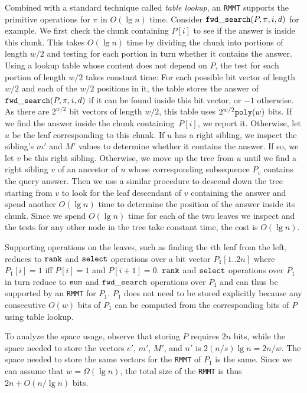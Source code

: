 Combined with a standard technique called {\em table lookup}, an {\tt RMMT}
supports the primitive operations
for $\pi$ in $O(\lg n)$ time.  Consider
$\mathtt{fwd\_search}(P,\pi,i,d)$ for example.  We first check the chunk containing $P[i]$
to see if the answer is inside this chunk.  This takes
$O(\lg n)$ time by dividing the chunk into portions of length $w/2$
and testing for each portion in turn whether it contains the answer.
Using a lookup table whose content does not
depend on $P$, the test for each portion of length $w/2$ takes
constant time: For each possible bit vector of length $w/2$ and each
of the $w/2$ positions in it, the table stores the answer
of $\mathtt{fwd\_search}(P,\pi,i,d)$ if it can be found inside this bit vector,
or $-1$ otherwise.  As there are $2^{w/2}$ bit vectors of length
$w/2$, this table uses $2^{w/2}\mathtt{poly}(w)$ bits.  If we find the answer
inside the chunk containing~$P[i]$, we report it.
Otherwise, let $u$ be the leaf corresponding to this
chunk.  If $u$ has a right sibling, we inspect the sibling's $m'$ and
$M'$ values to determine whether it contains the answer.  If so, we
let $v$ be this right sibling.  Otherwise, we move up the tree from
$u$ until we find a right sibling $v$ of an ancestor of $u$ whose
corresponding subsequence $P_v$ contains the query answer.  Then we
use a similar procedure to descend down the tree starting from $v$ to
look for the leaf descendant of $v$ containing the answer and spend
another $O(\lg n)$ time to determine the position of the answer
inside its chunk.  Since we spend $O(\lg n)$ time for each of
the two leaves we inspect and the tests for any other
node in the tree take constant time, the cost is $O(\lg n)$.

Supporting operations on the leaves, such as finding the $i$th leaf
from the left, reduces to $\mathtt{rank}$ and $\mathtt{select}$ operations over
a bit vector $P_1[1..2n]$ where $P_1[i] = 1$ iff $P[i] = 1$ and
$P[i+1] = 0$.  $\mathtt{rank}$ and $\mathtt{select}$ operations over $P_1$ in turn
reduce to $\mathtt{sum}$ and $\mathtt{fwd\_search}$ operations over $P_1$ and can thus
be supported by an {\tt RMMT} for $P_1$.  $P_1$ does not need to be
stored explicitly because any consecutive $O(w)$ bits of $P_1$ can be
computed from the corresponding bits of $P$ using table lookup.

To analyze the space usage, observe that storing $P$ requires $2n$
bits, while the space needed to store the vectors $e'$, $m'$, $M'$,
and $n'$ is $2(n/s) \lg n = 2n/w$.  The space needed to store the same
vectors for the {\tt RMMT} of $P_1$ is the same.  Since we can assume
that $w = \Omega(\lg n)$, the total size of the {\tt RMMT} is thus
$2n + O(n / \lg n)$ bits.
